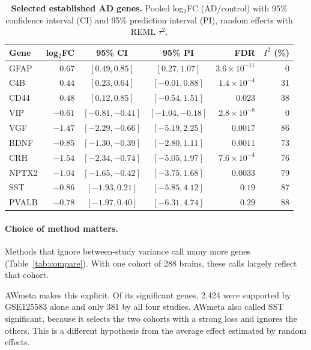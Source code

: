 \documentclass[11pt,a4paper]{article}
\begin{document}
\begin{table}[!htbp]
\centering
\footnotesize
\caption{\textbf{Selected established AD genes.} Pooled log$_2$FC (AD/control) with 95\% confidence interval (CI) and 95\% prediction interval (PI), random effects with REML $\tau^2$.}
\label{tab:genes}
\begin{tabular}{l r c c r r}
\toprule
\textbf{Gene} & \textbf{log$_2$FC} & \textbf{95\% CI} & \textbf{95\% PI} & \textbf{FDR} & \textbf{$I^2$ (\%)} \\
\midrule
GFAP  & $0.67$  & $[0.49, 0.85]$   & $[0.27, 1.07]$   & $3.6\times10^{-11}$ & 0 \\
C4B   & $0.44$  & $[0.23, 0.64]$   & $[-0.01, 0.88]$  & $1.4\times10^{-4}$ & 31 \\
CD44  & $0.48$  & $[0.12, 0.85]$   & $[-0.54, 1.51]$  & $0.023$ & 38 \\
VIP   & $-0.61$ & $[-0.81, -0.41]$ & $[-1.04, -0.18]$ & $2.8\times10^{-8}$ & 0 \\
VGF   & $-1.47$ & $[-2.29, -0.66]$ & $[-5.19, 2.25]$  & $0.0017$ & 86 \\
BDNF  & $-0.85$ & $[-1.30, -0.39]$ & $[-2.80, 1.11]$  & $0.0011$ & 73 \\
CRH   & $-1.54$ & $[-2.34, -0.74]$ & $[-5.05, 1.97]$  & $7.6\times10^{-4}$ & 76 \\
NPTX2 & $-1.04$ & $[-1.65, -0.42]$ & $[-3.75, 1.68]$  & $0.0033$ & 79 \\
SST   & $-0.86$ & $[-1.93, 0.21]$  & $[-5.85, 4.12]$  & $0.19$ & 87 \\
PVALB & $-0.78$ & $[-1.97, 0.40]$  & $[-6.31, 4.74]$  & $0.29$ & 88 \\
\bottomrule
\end{tabular}
\end{table}

\paragraph{Choice of method matters.} Methods that ignore between-study variance call many more genes (Table~\ref{tab:compare}). With one cohort of 288 brains, these calls largely reflect that cohort.

AWmeta makes this explicit. Of its significant genes, 2,424 were supported by GSE125583 alone and only 381 by all four studies. AWmeta also called SST significant, because it selects the two cohorts with a strong loss and ignores the others. This is a different hypothesis from the average effect estimated by random effects.
\end{document}
